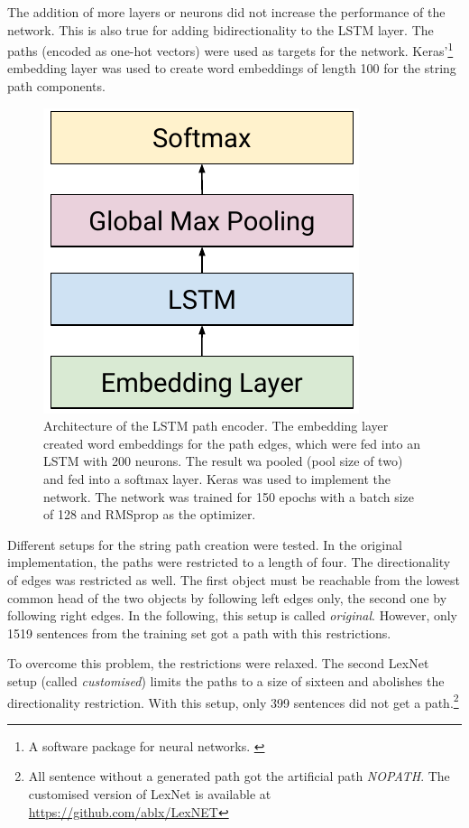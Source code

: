 The addition of more layers or neurons did not increase the performance of the network. This is also true for adding bidirectionality to the LSTM layer. The paths (encoded as one-hot vectors) were used as targets for the network. Keras'\footnote{A software package for neural networks. \cite{chollet2015keras} } embedding layer was used to create word embeddings of length 100 for the string path components.

\begin{figure}[htbp]
\centering
\caption{Architecture of the LSTM path encoder. The embedding layer created word embeddings for the path edges, which were fed into an LSTM with 200 neurons. The result wa pooled (pool size of two) and fed into a softmax layer. Keras was used to implement the network. The network was trained for 150 epochs with a batch size of 128 and RMSprop as the optimizer.}
\label{fig:lexnetnn}
\includegraphics{images/lex_arch}
\end{figure}



Different setups for the string path creation were tested. In the original implementation, the paths were restricted to a length of four. The directionality of edges was restricted as well. The first object must be reachable from the lowest common head of the two objects by following left edges only, the second one by following right edges. In the following, this setup is called \emph{original}. However, only 1519 sentences from the training set got a path with this restrictions. 

To overcome this problem, the restrictions were relaxed. The second LexNet setup (called \emph{customised}) limits the paths to a size of sixteen and abolishes the directionality restriction. With this setup, only 399 sentences did not get a path.\footnote{All sentence without a generated path got the artificial path \emph{NOPATH}. The customised version of LexNet is available at \url{https://github.com/ablx/LexNET}}






